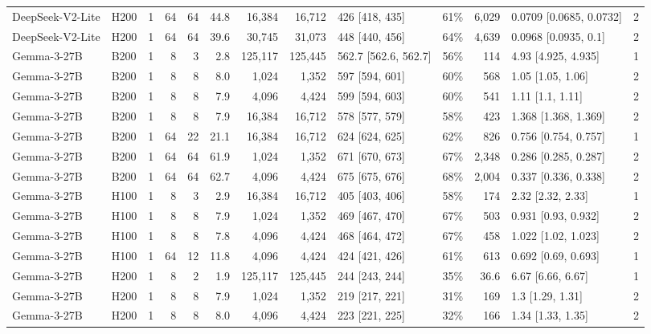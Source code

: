 \begin{landscape}
\begin{longtable}{llrrrrrrlrrlr}
DeepSeek-V2-Lite & H200 & 1 & 64 & 64 & 44.8 & 16,384 & 16,712 & 426 {[}418, 435{]} & 61\% & 6,029 & 0.0709 {[}0.0685, 0.0732{]} & 2 \\
DeepSeek-V2-Lite & H200 & 1 & 64 & 64 & 39.6 & 30,745 & 31,073 & 448 {[}440, 456{]} & 64\% & 4,639 & 0.0968 {[}0.0935, 0.1{]} & 2 \\
Gemma-3-27B & B200 & 1 & 8 & 3 & 2.8 & 125,117 & 125,445 & 562.7 {[}562.6, 562.7{]} & 56\% & 114 & 4.93 {[}4.925, 4.935{]} & 1 \\
Gemma-3-27B & B200 & 1 & 8 & 8 & 8.0 & 1,024 & 1,352 & 597 {[}594, 601{]} & 60\% & 568 & 1.05 {[}1.05, 1.06{]} & 2 \\
Gemma-3-27B & B200 & 1 & 8 & 8 & 7.9 & 4,096 & 4,424 & 599 {[}594, 603{]} & 60\% & 541 & 1.11 {[}1.1, 1.11{]} & 2 \\
Gemma-3-27B & B200 & 1 & 8 & 8 & 7.9 & 16,384 & 16,712 & 578 {[}577, 579{]} & 58\% & 423 & 1.368 {[}1.368, 1.369{]} & 2 \\
Gemma-3-27B & B200 & 1 & 64 & 22 & 21.1 & 16,384 & 16,712 & 624 {[}624, 625{]} & 62\% & 826 & 0.756 {[}0.754, 0.757{]} & 1 \\
Gemma-3-27B & B200 & 1 & 64 & 64 & 61.9 & 1,024 & 1,352 & 671 {[}670, 673{]} & 67\% & 2,348 & 0.286 {[}0.285, 0.287{]} & 2 \\
Gemma-3-27B & B200 & 1 & 64 & 64 & 62.7 & 4,096 & 4,424 & 675 {[}675, 676{]} & 68\% & 2,004 & 0.337 {[}0.336, 0.338{]} & 2 \\
Gemma-3-27B & H100 & 1 & 8 & 3 & 2.9 & 16,384 & 16,712 & 405 {[}403, 406{]} & 58\% & 174 & 2.32 {[}2.32, 2.33{]} & 1 \\
Gemma-3-27B & H100 & 1 & 8 & 8 & 7.9 & 1,024 & 1,352 & 469 {[}467, 470{]} & 67\% & 503 & 0.931 {[}0.93, 0.932{]} & 2 \\
Gemma-3-27B & H100 & 1 & 8 & 8 & 7.8 & 4,096 & 4,424 & 468 {[}464, 472{]} & 67\% & 458 & 1.022 {[}1.02, 1.023{]} & 2 \\
Gemma-3-27B & H100 & 1 & 64 & 12 & 11.8 & 4,096 & 4,424 & 424 {[}421, 426{]} & 61\% & 613 & 0.692 {[}0.69, 0.693{]} & 1 \\
Gemma-3-27B & H200 & 1 & 8 & 2 & 1.9 & 125,117 & 125,445 & 244 {[}243, 244{]} & 35\% & 36.6 & 6.67 {[}6.66, 6.67{]} & 1 \\
Gemma-3-27B & H200 & 1 & 8 & 8 & 7.9 & 1,024 & 1,352 & 219 {[}217, 221{]} & 31\% & 169 & 1.3 {[}1.29, 1.31{]} & 2 \\
Gemma-3-27B & H200 & 1 & 8 & 8 & 8.0 & 4,096 & 4,424 & 223 {[}221, 225{]} & 32\% & 166 & 1.34 {[}1.33, 1.35{]} & 2 \\

\end{longtable}
\end{landscape}
